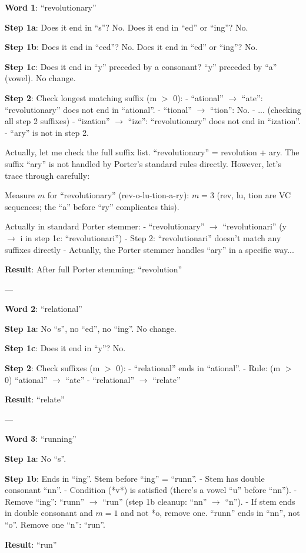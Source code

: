 \documentclass[11pt,a4paper]{article}
\begin{document}
\begin{tcolorbox}[colback=green!5!white,colframe=green!75!black,title=\textbf{Worked Example 25: Porter Stemmer Step-by-Step}]
\textbf{Word 1}: ``revolutionary''

\textbf{Step 1a}: Does it end in ``s''? No. Does it end in ``ed'' or ``ing''? No.

\textbf{Step 1b}: Does it end in ``eed''? No.
Does it end in ``ed'' or ``ing''? No.

\textbf{Step 1c}: Does it end in ``y'' preceded by a consonant? ``y'' preceded by ``a'' (vowel). No change.

\textbf{Step 2}: Check longest matching suffix (m $>$ 0):
- ``ational'' $\to$ ``ate'': ``revolutionary'' does not end in ``ational''.
- ``tional'' $\to$ ``tion'': No.
- ... (checking all step 2 suffixes)
- ``ization'' $\to$ ``ize'': ``revolutionary'' does not end in ``ization''.
- ``ary'' is not in step 2.

Actually, let me check the full suffix list. ``revolutionary'' = revolution + ary. The suffix ``ary'' is not handled by Porter's standard rules directly. However, let's trace through carefully:

Measure $m$ for ``revolutionary'' (rev-o-lu-tion-a-ry): $m = 3$ (rev, lu, tion are VC sequences; the ``a'' before ``ry'' complicates this).

Actually in standard Porter stemmer:
- ``revolutionary'' $\to$ ``revolutionari'' (y $\to$ i in step 1c: ``revolutionari'')
- Step 2: ``revolutionari'' doesn't match any suffixes directly
- Actually, the Porter stemmer handles ``ary'' in a specific way...

\textbf{Result}: After full Porter stemming: ``revolution''

---

\textbf{Word 2}: ``relational''

\textbf{Step 1a}: No ``s'', no ``ed'', no ``ing''. No change.

\textbf{Step 1c}: Does it end in ``y''? No.

\textbf{Step 2}: Check suffixes (m $>$ 0):
- ``relational'' ends in ``ational''.
- Rule: (m $>$ 0) ``ational'' $\to$ ``ate''
- ``relational'' $\to$ ``relate''

\textbf{Result}: ``relate''

---

\textbf{Word 3}: ``running''

\textbf{Step 1a}: No ``s''.

\textbf{Step 1b}: Ends in ``ing''. Stem before ``ing'' = ``runn''.
- Stem has double consonant ``nn''.
- Condition (*v*) is satisfied (there's a vowel ``u'' before ``nn'').
- Remove ``ing'': ``runn'' $\to$ ``run'' (step 1b cleanup: ``nn'' $\to$ ``n'').
- If stem ends in double consonant and $m = 1$ and not *o, remove one. ``runn'' ends in ``nn'', not ``o''. Remove one ``n'': ``run''.

\textbf{Result}: ``run''
\end{tcolorbox}
\end{document}
